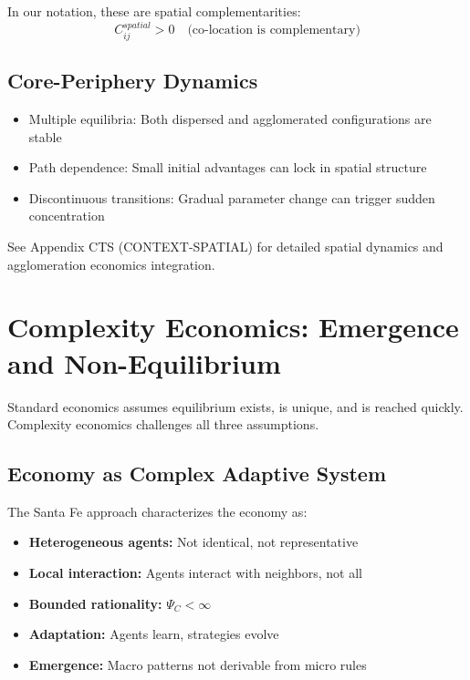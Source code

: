 In our notation, these are spatial complementarities:
\begin{equation}
C_{ij}^{spatial} > 0 \quad \text{(co-location is complementary)}
\label{eq:spatial-complementarity}
\end{equation}

\subsection{Core-Periphery Dynamics}

\begin{itemize}[nosep]
  \item Multiple equilibria: Both dispersed and agglomerated configurations are stable
  \item Path dependence: Small initial advantages can lock in spatial structure
  \item Discontinuous transitions: Gradual parameter change can trigger sudden concentration
\end{itemize}

\begin{cross-reference}
See Appendix CTS (CONTEXT-SPATIAL) for detailed spatial dynamics
and agglomeration economics integration.
\end{cross-reference}



\section{Complexity Economics: Emergence and Non-Equilibrium}
\label{sec:context-complexity}


Standard economics assumes equilibrium exists, is unique, and is reached quickly.
Complexity economics \citep{arthur2015} challenges all three assumptions.

\subsection{Economy as Complex Adaptive System}

The Santa Fe approach \citep{arthur1997} characterizes the economy as:
\begin{itemize}[nosep]
  \item \textbf{Heterogeneous agents:} Not identical, not representative
  \item \textbf{Local interaction:} Agents interact with neighbors, not all
  \item \textbf{Bounded rationality:} $\Psi_C < \infty$
  \item \textbf{Adaptation:} Agents learn, strategies evolve
  \item \textbf{Emergence:} Macro patterns not derivable from micro rules
\end{itemize}


